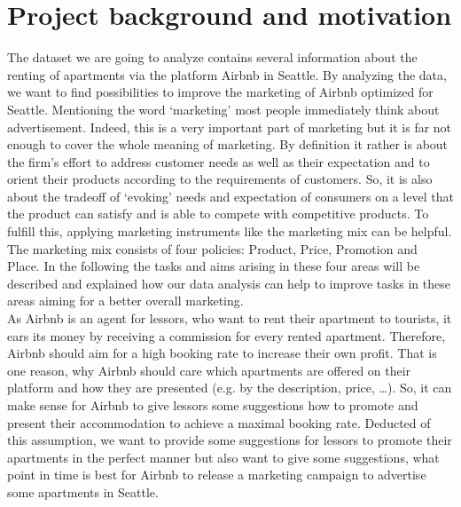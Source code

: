 \section{Project background and motivation}
 The dataset we are going to analyze contains several information about the renting of apartments via the platform Airbnb in Seattle. By analyzing the data, we want to find possibilities to improve the marketing of Airbnb optimized for Seattle. Mentioning the word ‘marketing’ most people immediately think about advertisement. Indeed, this is a very important part of marketing but it is far not enough to cover the whole meaning of marketing. By definition it rather is about the firm’s effort to address customer needs as well as their expectation and to orient their products according to the requirements of customers. So, it is also about the tradeoff of ‘evoking’ needs and expectation of consumers on a level that the product can satisfy and is able to compete with competitive products. To fulfill this, applying marketing instruments like the marketing mix can be helpful. The marketing mix consists of four policies: Product, Price, Promotion and Place. In the following the tasks and aims arising in these four areas will be described and explained how our data analysis can help to improve tasks in these areas aiming for a better overall marketing.\\As Airbnb is an agent for lessors, who want to rent their apartment to tourists, it ears its money by receiving a commission for every rented apartment. Therefore, Airbnb should aim for a high booking rate to increase their own profit. That is one reason, why Airbnb should care which apartments are offered on their platform and how they are presented (e.g. by the description, price, …). So, it can make sense for Airbnb to give lessors some suggestions how to promote and present their accommodation to achieve a maximal booking rate. Deducted of this assumption, we want to provide some suggestions for lessors to promote their apartments in the perfect manner but also want to give some suggestions, what point in time is best for Airbnb to release a marketing campaign to advertise some apartments in Seattle. 
